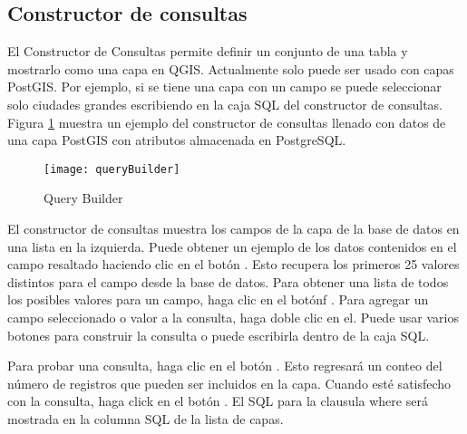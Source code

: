 \subsection{Constructor de consultas}\label{sec:query_builder}

El Constructor de Consultas permite definir un conjunto de una tabla y mostrarlo como una capa en QGIS. Actualmente solo puede ser usado con capas PostGIS. 
Por ejemplo, si se tiene una capa  con un campo  se puede seleccionar solo ciudades grandes escribiendo  en la caja SQL del constructor de consultas. Figura
\ref{fig:query_builder} muestra un ejemplo del constructor de consultas llenado con datos de una capa PostGIS con atributos almacenada en PostgreSQL. 

\begin{figure}[ht]
  \begin{center}
    \caption{Query Builder \nixcaption}\label{fig:query_builder}\smallskip
    \texttt{[image: queryBuilder]}
  \end{center}  
\end{figure}

El constructor de consultas  muestra los campos de la capa de la base de datos en una lista en la izquierda. Puede obtener un ejemplo de los datos contenidos en el campo resaltado haciendo clic en el bot\'on  . Esto recupera los primeros 25 valores distintos para el campo desde la base de datos. Para obtener una lista de todos los posibles valores para un campo, haga clic en el bot\'onf  . Para agregar un campo seleccionado o valor a la consulta, haga doble clic en el. Puede usar varios botones para construir la consulta o puede escribirla dentro de la caja SQL.

Para probar una consulta, haga clic en el bot\'on  . Esto regresar\'a un conteo del n\'umero de registros que pueden ser incluidos en la capa. Cuando est\'e satisfecho con la consulta, haga click en el bot\'on . El SQL para la clausula where ser\'a mostrada en la columna SQL de la lista de capas.

\begin{Tip}\caption{\textsc{Changing the Layer Definition}}
\end{Tip}

